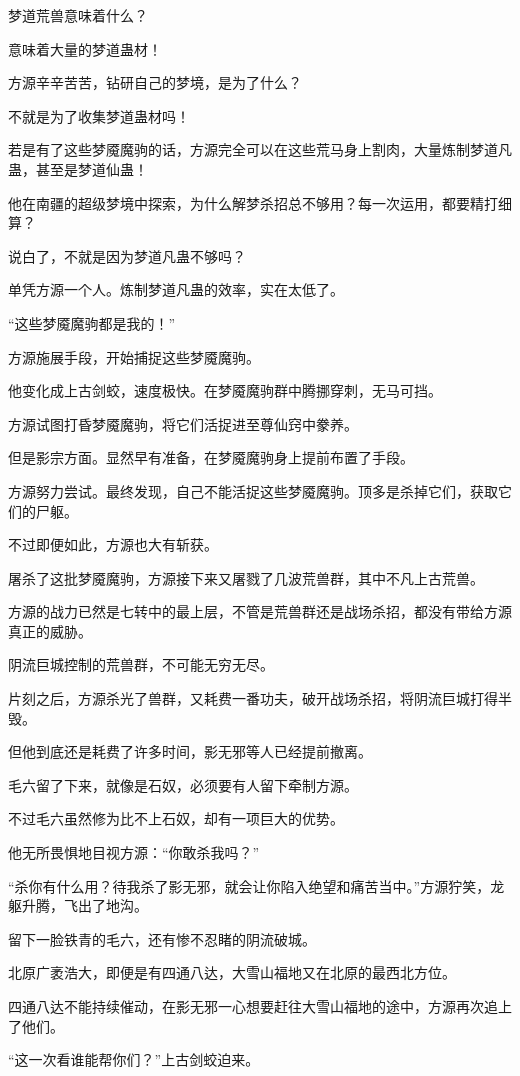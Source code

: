 \begin{this_body}
梦道荒兽意味着什么？

意味着大量的梦道蛊材！

方源辛辛苦苦，钻研自己的梦境，是为了什么？

不就是为了收集梦道蛊材吗！

若是有了这些梦魇魔驹的话，方源完全可以在这些荒马身上割肉，大量炼制梦道凡蛊，甚至是梦道仙蛊！

他在南疆的超级梦境中探索，为什么解梦杀招总不够用？每一次运用，都要精打细算？

说白了，不就是因为梦道凡蛊不够吗？

单凭方源一个人。炼制梦道凡蛊的效率，实在太低了。

“这些梦魇魔驹都是我的！”

方源施展手段，开始捕捉这些梦魇魔驹。

他变化成上古剑蛟，速度极快。在梦魇魔驹群中腾挪穿刺，无马可挡。

方源试图打昏梦魇魔驹，将它们活捉进至尊仙窍中豢养。

但是影宗方面。显然早有准备，在梦魇魔驹身上提前布置了手段。

方源努力尝试。最终发现，自己不能活捉这些梦魇魔驹。顶多是杀掉它们，获取它们的尸躯。

不过即便如此，方源也大有斩获。

屠杀了这批梦魇魔驹，方源接下来又屠戮了几波荒兽群，其中不凡上古荒兽。

方源的战力已然是七转中的最上层，不管是荒兽群还是战场杀招，都没有带给方源真正的威胁。

阴流巨城控制的荒兽群，不可能无穷无尽。

片刻之后，方源杀光了兽群，又耗费一番功夫，破开战场杀招，将阴流巨城打得半毁。

但他到底还是耗费了许多时间，影无邪等人已经提前撤离。

毛六留了下来，就像是石奴，必须要有人留下牵制方源。

不过毛六虽然修为比不上石奴，却有一项巨大的优势。

他无所畏惧地目视方源：“你敢杀我吗？”

“杀你有什么用？待我杀了影无邪，就会让你陷入绝望和痛苦当中。”方源狞笑，龙躯升腾，飞出了地沟。

留下一脸铁青的毛六，还有惨不忍睹的阴流破城。

北原广袤浩大，即便是有四通八达，大雪山福地又在北原的最西北方位。

四通八达不能持续催动，在影无邪一心想要赶往大雪山福地的途中，方源再次追上了他们。

“这一次看谁能帮你们？”上古剑蛟迫来。


\end{this_body}

